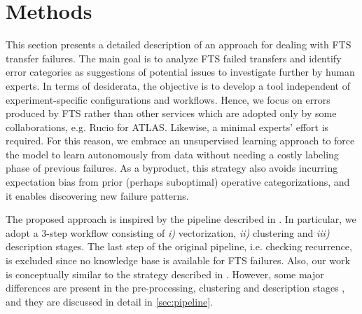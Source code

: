 \chapter{Methods}

This section presents a detailed description of an approach for dealing with FTS transfer failures. %
The main goal is to analyze FTS failed transfers and identify error categories as suggestions of potential issues to investigate further by human experts.
In terms of desiderata, the objective is to develop a tool independent of experiment-specific configurations and workflows. Hence, we focus on errors produced by FTS rather than other services which are adopted only by some collaborations, e.g. Rucio for ATLAS.
Likewise, a minimal experts' effort is required. For this reason, we embrace an unsupervised learning approach to force the model to learn autonomously from data without needing a costly labeling phase of previous failures.
As a byproduct, this strategy also avoids incurring expectation bias from prior (perhaps suboptimal) operative categorizations, and it enables discovering new failure patterns.

The proposed approach \cite[Section 2.19]{opint2022} is inspired by the pipeline described in . %
In particular, we adopt a 3-step workflow consisting of \textit{i)} vectorization, \textit{ii)} clustering and \textit{iii)} description stages. 
The last step of the original pipeline, i.e. checking recurrence, is excluded since no knowledge base is available for FTS failures.
Also, our work is conceptually similar to the strategy described in . However, some major differences are present in the pre-processing, clustering and description stages%
, and they are discussed in detail in \cref{sec:pipeline}.

